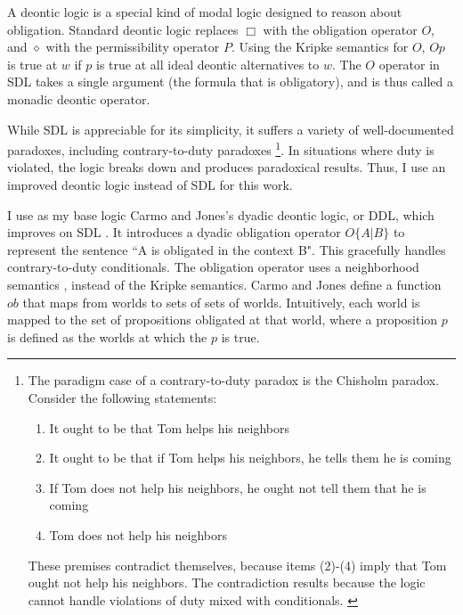 \begin{isabellebody}
\begin{isamarkuptext}
A deontic logic is a special kind of modal logic designed to reason about obligation. Standard deontic
logic \cite{cresswell, sep-logic-deontic} replaces $\Box$ with the obligation operator
$O$, and $\diamond$ with the permissibility operator $P$. Using the Kripke semantics for $O$, $O p$ 
is true at $w$ if $p$ is true at all  ideal deontic alternatives to $w$. The $O$ operator in SDL
takes a single argument (the formula that is obligatory), and is thus called a monadic deontic operator.

 While SDL is appreciable for its simplicity, it suffers a variety of well-documented paradoxes, 
including contrary-to-duty paradoxes \footnote{The paradigm case of a contrary-to-duty paradox is the 
Chisholm paradox. Consider the following statements: \begin{enumerate}
\item It ought to be that Tom helps his neighbors
\item It ought to be that if Tom helps his neighbors, he tells them he is coming
\item If Tom does not help his neighbors, he ought not tell them that he is coming
\item Tom does not help his neighbors
\end{enumerate} 
These premises contradict themselves, because items (2)-(4) imply that Tom ought not help his neighbors. The 
contradiction results because the logic cannot handle violations of duty mixed with
conditionals. \cite{chisholm, ctd}
}. 
In situations where duty is violated, the logic breaks down 
and produces paradoxical results. Thus, I use an improved deontic logic instead of SDL for this work.%
\end{isamarkuptext}\isamarkuptrue%
%
\isadelimdocument
%
\endisadelimdocument
%
\isatagdocument
%
\isamarkuptrue%
%
\endisatagdocument
{\isafolddocument}%
%
\isadelimdocument
%
\endisadelimdocument
%
\begin{isamarkuptext}%
I use as my base logic Carmo and Jones's dyadic deontic logic, or DDL, which improves on SDL \cite{CJDDL}. 
It introduces a dyadic obligation operator $O\{A \vert B\}$ 
to represent the sentence ``A is obligated in the context B". This gracefully handles contrary-to-duty
conditionals. The obligation operator uses a neighborhood semantics \cite{neighborhood1, neighborhood2}, instead of the Kripke semantics. 
Carmo and Jones define a function $ob$ that maps from worlds to sets of sets of worlds. Intuitively, 
each world is mapped to the set of propositions obligated at that world, where a proposition $p$ is defined as 
the worlds at which the $p$ is true.


\end{isamarkuptext}
\end{isabellebody}
